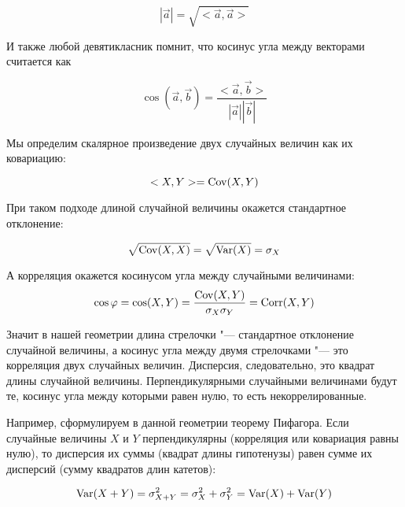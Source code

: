 \documentclass[10pt]{article}
\newcommand\markangle[6]{%
  \begin{scope}
    \path[clip] (#1) -- (#2) -- (#3);
    \fill[color=red,fill opacity=0.5,draw=red,name path=circle]
    (#1) circle (#4);
  \end{scope}
  \path[name path=line one] (#1) -- (#2);
  \path[name path=line two] (#1) -- (#3);
  \path[%
  name intersections={of=line one and circle, by={inter one}},
  name intersections={of=line two and circle, by={inter two}}
  ] (inter one) -- (inter two) coordinate[pos=.5] (middle);
  \node at ($(#1)!#5!(middle)$) {#6};
}
\begin{document}
\[
|\vec{a}|=\sqrt{<\vec{a},\vec{a}>}
\]

И также любой девятикласник помнит, что косинус угла между векторами считается как

\[
\cos(\vec{a},\vec{b})=\frac{<\vec{a},\vec{b}>}{|\vec{a}||\vec{b}|}
\]

Мы определим скалярное произведение двух случайных величин как их ковариацию:

\[
<X,Y>=\operatorname{Cov}(X,Y)
\]

При таком подходе длиной случайной величины окажется стандартное отклонение:

\[
\sqrt{\operatorname{Cov}(X,X)}=\sqrt{\operatorname{Var}(X)}=\sigma_X
\]

А корреляция окажется косинусом угла между случайными величинами:
\[
\cos \varphi =\cos(X,Y)=\frac{\operatorname{Cov}(X,Y)}{\sigma_X\sigma_Y}=\operatorname{Corr}(X,Y)
\]


\begin{center}
\end{center}

Значит в нашей геометрии  длина стрелочки "--- стандартное отклонение случайной величины, а косинус угла между двумя стрелочками "--- это корреляция двух случайных величин. Дисперсия, следовательно, это квадрат длины случайной величины. Перпендикулярными случайными величинами будут те, косинус угла между которыми равен нулю, то есть некоррелированные.

Например, сформулируем в данной геометрии теорему Пифагора. Если случайные величины $X$ и $Y$ перпендикулярны (корреляция или ковариация равны нулю), то дисперсия их суммы (квадрат длины гипотенузы) равен сумме их дисперсий (сумму квадратов длин катетов):

\[
\operatorname{Var}(X+Y)=\sigma^2_{X+Y}=\sigma^2_X+\sigma^2_Y=\operatorname{Var}(X)+\operatorname{Var}(Y)
\]

\begin{center}
\end{center}
\end{document}
